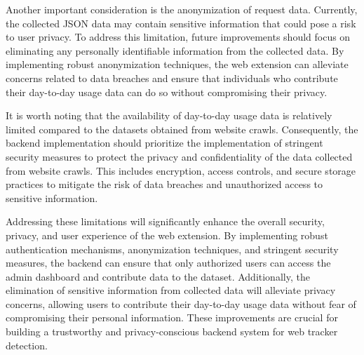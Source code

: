 Another important consideration is the anonymization of request data. Currently, the collected JSON data may contain sensitive
information that could pose a risk to user privacy. To address this limitation, future improvements should focus on eliminating
any personally identifiable information from the collected data. By implementing robust anonymization techniques, the web extension
can alleviate concerns related to data breaches and ensure that individuals who contribute their day-to-day usage data can do so
without compromising their privacy.

It is worth noting that the availability of day-to-day usage data is relatively limited compared to the datasets obtained from website
crawls. Consequently, the backend implementation should prioritize the implementation of stringent security measures to protect the
privacy and confidentiality of the data collected from website crawls. This includes encryption, access controls, and secure storage
practices to mitigate the risk of data breaches and unauthorized access to sensitive information.

Addressing these limitations will significantly enhance the overall security, privacy, and user experience of the web extension.
By implementing robust authentication mechanisms, anonymization techniques, and stringent security measures, the backend can ensure
that only authorized users can access the admin dashboard and contribute data to the dataset. Additionally, the elimination of sensitive
information from collected data will alleviate privacy concerns, allowing users to contribute their day-to-day usage data without fear
of compromising their personal information. These improvements are crucial for building a trustworthy and privacy-conscious backend
system for web tracker detection.
